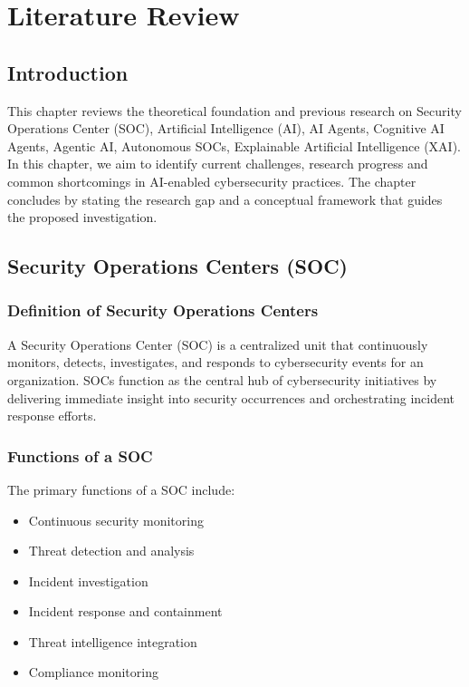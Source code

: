 \documentclass[12pt,a4paper]{report}
\begin{document}
\chapter{Literature Review}
\label{ch:literature}

\section{Introduction}
\label{sec:lit_intro}

This chapter reviews the theoretical foundation and previous research on Security Operations Center (SOC), Artificial Intelligence (AI), AI Agents, Cognitive AI Agents, Agentic AI, Autonomous SOCs, Explainable Artificial Intelligence (XAI). In this chapter, we aim to identify current challenges, research progress and common shortcomings in AI-enabled cybersecurity practices. The chapter concludes by stating the research gap and a conceptual framework that guides the proposed investigation.

\section{Security Operations Centers (SOC)}
\label{sec:soc}

\subsection{Definition of Security Operations Centers}
A Security Operations Center (SOC) is a centralized unit that continuously monitors, detects, investigates, and responds to cybersecurity events for an organization. SOCs function as the central hub of cybersecurity initiatives by delivering immediate insight into security occurrences and orchestrating incident response efforts.

\subsection{Functions of a SOC}
The primary functions of a SOC include:
\begin{itemize}
    \item Continuous security monitoring
    \item Threat detection and analysis
    \item Incident investigation
    \item Incident response and containment
    \item Threat intelligence integration
    \item Compliance monitoring
\end{itemize}
\end{document}
